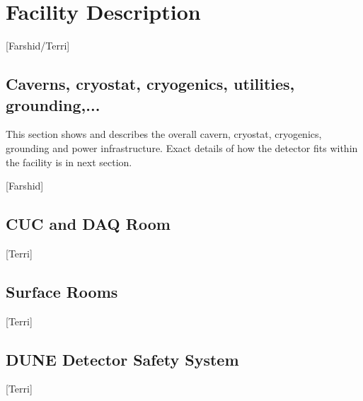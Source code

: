 \chapter{Facility Description}
\label{vl:tc-facility}

[Farshid/Terri]

\section{Caverns, cryostat, cryogenics, utilities, grounding,...}

This section shows and describes the overall cavern, cryostat,
cryogenics, grounding and power infrastructure. Exact details of how
the detector fits within the facility is in next section.

[Farshid]

\section{CUC and DAQ Room}

[Terri]

\section{Surface Rooms}

[Terri]

\section{DUNE Detector Safety System}

[Terri]


